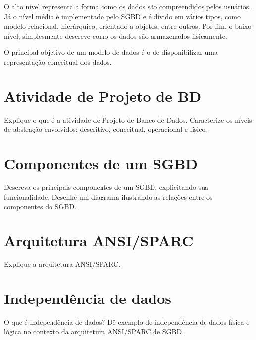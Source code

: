 \documentclass[12pt]{article}
\begin{document}
O alto nível representa a forma como os dados são compreendidos pelos usuários. Já o nível médio é implementado pelo SGBD e é divido em vários tipos, como modelo relacional, hierárquico, orientado a objetos, entre outros. Por fim, o baixo nível, simplesmente descreve como os dados são armazenados fisicamente.

O principal objetivo de um modelo de dados é o de disponibilizar uma representação conceitual dos dados.

\section{Atividade de Projeto de BD}
Explique o que é a atividade de Projeto de Banco de Dados. Caracterize os níveis de abstração envolvidos: descritivo, conceitual, operacional e físico.

\section{Componentes de um SGBD}
Descreva os principais componentes de um SGBD, explicitando sua funcionalidade. Desenhe um diagrama ilustrando as relações entre os componentes do SGBD.

\section{Arquitetura ANSI/SPARC}
Explique a arquitetura ANSI/SPARC.

\section{Independência de dados}
O que é independência de dados? Dê exemplo de independência de dados física e lógica no contexto da arquitetura ANSI/SPARC de SGBD.
\end{document}
